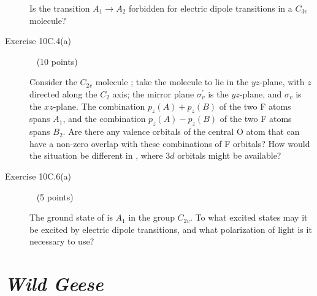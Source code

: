 \documentclass[10pt, letterpaper]{memoir}
\begin{document}
\begin{description}
	      Is the transition $A_1\rightarrow A_2$ forbidden for electric dipole transitions in a $C_{3v}$ molecule?

	      \vspace{5em}
	\item [Exercise 10C.4(a)] ~ (10 points)

	      Consider the $C_{2v}$ molecule ; take the molecule to lie in the $yz$-plane, with $z$ directed along the $C_2$ axis; the mirror plane $\sigma^\prime_v$ is the $yz$-plane, and $\sigma_v$ is the $xz$-plane. The combination $p_z(A)+p_z(B)$ of the two F atoms spans $A_1$, and the combination $p_z(A)-p_z(B)$ of the two F atoms spans $B_2$. Are there any valence orbitals of the central O atom that can have a non-zero overlap with these combinations of F orbitals? How would the situation be different in , where $3d$ orbitals might be available?

	      \vspace{20em}
	\item [Exercise 10C.6(a)] ~ (5 points)

	      The ground state of  is $A_1$ in the group $C_{2v}$. To what excited states may it be excited by electric dipole transitions, and what polarization of light is it necessary to use?
\end{description}

\newpage
\pagestyle{empty}
\addtocounter{page}{-1}
\section*{\emph{Wild Geese}}
\end{document}
